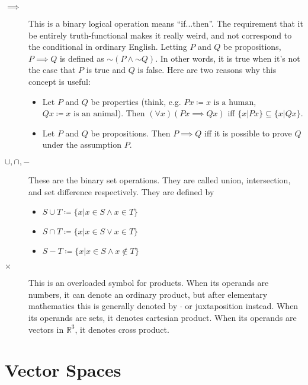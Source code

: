 \documentclass[12pt]{article}
\newcommand*{\oldneg}{\mathord{\sim}}
\begin{document}
\begin{description}
  \item[$\implies$] This is a binary logical operation means
    ``if...then''.  The requirement that it be entirely
    truth-functional makes it really weird, and not correspond to the
    conditional in ordinary English.  Letting $P$ and $Q$ be
    propositions, $P\implies Q$ is defined as $\oldneg (P\wedge\oldneg
    Q)$.  In other words, it is true when it's not the case that $P$
    is true and $Q$ is false. Here are two reasons why this concept is
    useful:
    \begin{itemize}
      \item Let $P$ and $Q$ be properties (think, e.g. $Px\coloneqq
        x\textrm{ is a human}$, $Qx\coloneqq x\textrm{ is an
          animal}$).  Then $(\forall x)(Px\implies Qx)$ iff
        $\{x|Px\}\subseteq \{x|Qx\}$.
      \item Let $P$ and $Q$ be propositions.  Then $P\implies Q$ iff
        it is possible to prove $Q$ under the assumption $P$.
    \end{itemize}
    
  \item[$\cup,\cap,-$] These are the binary set operations.  They are
    called union, intersection, and set difference respectively.  They
    are defined by
    \begin{itemize}
    \item $S\cup T \coloneqq \{x | x\in S \wedge x\in T\}$ 
    \item $S\cap T \coloneqq \{x | x\in S \vee x\in T\}$ 
    \item $S-T \coloneqq \{x | x\in S \wedge x\not\in T\}$ 
    \end{itemize}

  \item[$\times$] This is an overloaded symbol for products.  When its
    operands are numbers, it can denote an ordinary product, but after
    elementary mathematics this is generally denoted by $\cdot$ or
    juxtaposition instead.  When its operands are sets, it denotes
    cartesian product.  When its operands are vectors in
    $\mathbb{R}^3$, it denotes cross product.

    \end{description}
    
\section{Vector Spaces}
\end{document}
